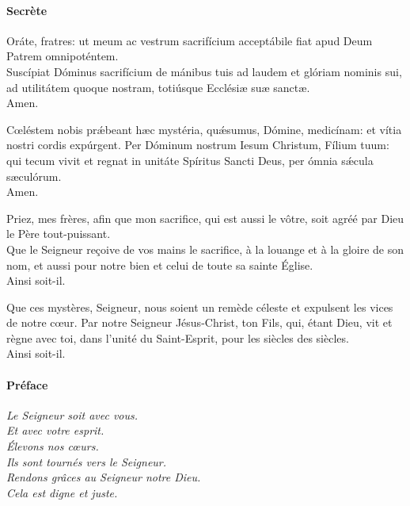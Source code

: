 \documentclass[twoside]{article}
\begin{document}
\paragraph{Secrète}

\begin{paracol}{2}

\vv Oráte, fratres: ut meum ac vestrum sacrifícium acceptábile fiat apud Deum Patrem omnipoténtem.\\
\rr Suscípiat Dóminus sacrifícium de mánibus tuis ad laudem et glóriam nominis sui, ad utilitátem quoque nostram, totiúsque Ecclésiæ suæ sanctæ.\\
\vv Amen.

Cœléstem nobis prǽbeant hæc mystéria, quǽsumus, Dómine, medicínam: et vítia nostri cordis expúrgent.
Per Dóminum nostrum Iesum Christum, Fílium tuum: qui tecum vivit et regnat in unitáte Spíritus Sancti Deus, per ómnia sǽcula sæculórum.\\
\rr Amen.

\switchcolumn

\vv Priez, mes frères, aﬁn que mon sacriﬁce, qui est aussi le vôtre, soit agréé par Dieu le Père tout-puissant.\\
\rr Que le Seigneur reçoive de vos mains le sacriﬁce, à la louange et à la gloire de son nom, et aussi pour notre bien et celui de toute sa sainte Église.\\
\vv Ainsi soit-il.

Que ces mystères, Seigneur, nous soient un remède céleste et expulsent les vices de notre cœur.
Par notre Seigneur Jésus-Christ, ton Fils, qui, étant Dieu, vit et règne avec toi, dans l’unité du Saint-Esprit, pour les siècles des siècles.\\
\rr Ainsi soit-il.

\end{paracol}

\paragraph{Préface}


\emph{\vv Le Seigneur soit avec vous.\\
\rr Et avec votre esprit.\\
\vv Élevons nos cœurs.\\
\rr Ils sont tournés vers le Seigneur.\\
\vv Rendons grâces au Seigneur notre Dieu.\\
\rr Cela est digne et juste.}
\end{document}
